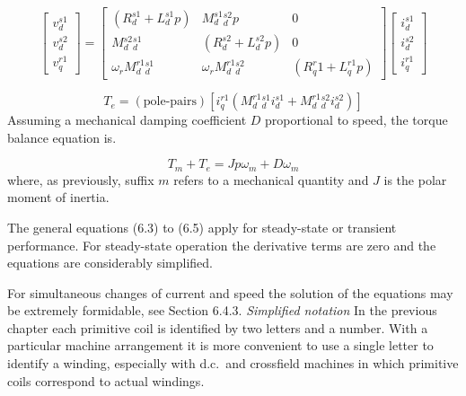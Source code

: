 \documentclass[a4paper,numbers=noenddot,12pt]{scrbook}
\begin{document}
        \begin{equation}
            \begin{bmatrix}
                v_d^{s1}\\[2ex] v_d^{s2}\\[2ex] v_q^{r1}
            \end{bmatrix} =
            \begin{bmatrix}
                (R_d^{s1} + L_d^{s1}p) & M_{d}^{s1}{}_{d}^{s2} p & 0 \\[2ex]
                M{_d^{s2}{}_d^{s1}} & (R_d^{s2} + L_d^{s2}p) & 0 \\[2ex]
                \omega_r M_{d}^{r1}{}_d^{s1} & \omega_r M_{d}^{r1}{}_d^{s2} & (R_q^r1{} + L_q^{r1}p)
            \end{bmatrix}
            \begin{bmatrix}
                i_d^{s1} \\[2ex] i_d^{s2} \\[2ex] i_q^{r1}
            \end{bmatrix}
            \label{}
        \end{equation}

        \begin{equation}
            T_e = (\text{pole-pairs})[i_q^{r1}(M_d^{r1}{}_d^{s1} i_d^{s1} + M_d^{r1}{}_d^{s2} i_d^{s2})]
            \label{}
        \end{equation}
        Assuming a mechanical damping coefficient $D$ proportional to speed, the torque balance equation is.

        \begin{equation}
            T_m + T_e = J p \omega_m + D \omega_m
            \label{}
        \end{equation}
        where, as previously, suffix $m$ refers to a mechanical quantity and $J$ is the polar moment of inertia.

        The general equations (6.3) to (6.5) apply for steady-state or transient performance. For steady-state operation the derivative terms are zero and the equations are considerably simplified.

        For simultaneous changes of current and speed the solution of the equations may be extremely formidable, see Section 6.4.3.
        \noindent \textit{Simplified notation} In the previous chapter each primitive coil is identified by two letters and a number. With a particular machine arrangement it is more convenient to use a single letter to identify a winding, especially with d.c.\ and crossfield machines in which primitive coils correspond to actual windings.
\end{document}
